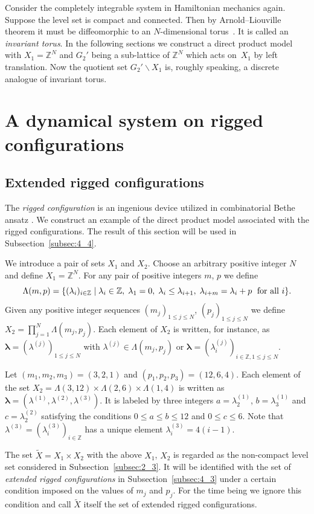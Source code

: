 \documentclass[11pt]{article}
\newcommand{\Z}{{\mathbb Z}}
\newcommand\bol{\boldsymbol{\lambda}}
\begin{document}
Consider the completely integrable system in Hamiltonian mechanics again.
Suppose the level set is compact and connected.
Then by Arnold--Liouville theorem it must be dif\/feomorphic to an $N$-dimensional torus~\cite{A}.
It is called an \textit{invariant torus}.
In the following sections we construct a direct product model
with $X_1 = \Z^N$ and $G_2'$ being a sub-lattice of $\Z^N$
which acts on~$X_1$ by left translation.
Now the quotient set $G_2' \backslash X_1$ is, roughly speaking, a discrete
analogue of invariant torus.

\section{A dynamical system on rigged conf\/igurations}\label{sec:3}
\subsection{Extended rigged conf\/igurations}\label{subsec:3_1}

The \textit{rigged configuration}
is an ingenious device utilized in combinatorial Bethe ansatz \cite{KKR,KR}.
We construct an example of the direct product model
associated with the rigged conf\/igurations.
The result of this section will be used in Subsection~\ref{subsec:4_4}.

We introduce a pair of sets $X_1$ and $X_2$.
Choose an arbitrary positive integer $N$ and def\/ine $X_1 = \Z^N$.
For any pair of positive integers $m$, $p$ we def\/ine
\begin{equation}\label{eq:may1_1}
\Lambda (m,p) = \{(\lambda_i)_{i \in \Z} \mid
\lambda_i \in \Z, \; \lambda_1 = 0, \; \lambda_i \le \lambda_{i+1}, \; \lambda_{i+m} = \lambda_i + p\;
\hbox{ for all } i \}.
\end{equation}
Given any positive integer sequences $(m_j)_{1 \leq j \leq N}$, $(p_j)_{1 \leq j \leq N}$
we def\/ine $X_2 = \prod_{j=1}^N \Lambda (m_j,p_j)$.
Each element of $X_2$ is written, for instance, as
$\bol = (\lambda^{(j)})_{1 \leq j \leq N}$ with $\lambda^{(j)} \in \Lambda (m_j,p_j)$
or $\bol = (\lambda^{(j)}_i)_{i \in \Z, 1 \leq j \leq N}$.

\begin{example}\label{ex:oct13_1}
Let $(m_1, m_2, m_3) = (3,2,1)$ and $(p_1, p_2, p_3) = (12,6,4)$.
Each element of the set $X_2 = \Lambda (3,12) \times \Lambda (2,6) \times \Lambda (1,4)$
is written as $\bol = (\lambda^{(1)}, \lambda^{(2)},\lambda^{(3)})$.
It is labeled by {three} integers $a=\lambda^{(1)}_2$, $b=\lambda^{(1)}_3$
and $c=\lambda^{(2)}_2$ satisfying the conditions $0 \leq a \leq b \leq 12$ and $0 \leq c \leq 6$.
Note that $\lambda^{(3)} = (\lambda^{(3)}_i)_{i \in \Z}$ has {a unique} element $\lambda^{(3)}_i = 4 (i-1)$.
\end{example}
The set $\tilde{X} = X_1 \times X_2$ with the above $X_1$, $X_2$ is regarded as the non-compact level set
considered in Subsection~\ref{subsec:2_3}.
It will be identif\/ied with the set of {\em extended rigged configurations} in Subsection~\ref{subsec:4_3}
under a certain condition imposed on the values of $m_j$ and $p_j$.
For the time being we ignore this condition and call $\tilde{X}$ itself the set of extended rigged conf\/igurations.
\end{document}
